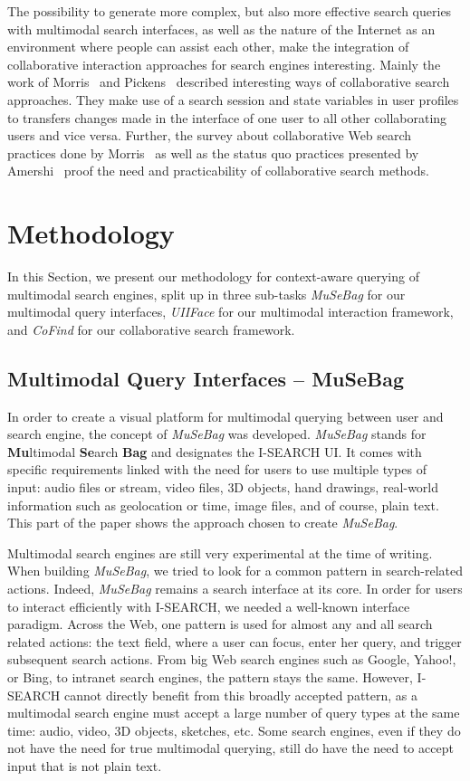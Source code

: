 \documentclass[runningheads,a4paper]{llncs} \usepackage[utf8]{inputenc}
\begin{document}
The possibility to generate more complex, but also more effective search queries with multimodal search interfaces, as well as the nature of the Internet as an environment where people can assist each other, make the integration of
collaborative interaction approaches for search engines interesting. Mainly the work of Morris~\cite{morris2007} and Pickens~\cite{pickens2008} described interesting ways of collaborative search approaches. They make use of a search
session and state variables in user profiles to transfers changes made in the interface of one user to all other collaborating users and vice versa. Further, the survey about collaborative Web search practices done by Morris~\cite{morris2008} as well as the status quo practices presented by Amershi~\cite{amershi2009} proof the need and practicability of collaborative search methods.

\section{Methodology}
In this Section, we present our methodology for context-aware querying of multimodal search engines, split up in three sub-tasks \emph{MuSeBag} for our multimodal query interfaces, \emph{UIIFace} for our multimodal interaction framework, and \emph{CoFind} for our collaborative search framework.

\subsection{Multimodal Query Interfaces -- MuSeBag}
In order to create a visual platform for multimodal querying between user and search engine, the concept of \emph{MuSeBag} was developed. \emph{MuSeBag} stands for \textbf{Mu}ltimodal \textbf{Se}arch \textbf{Bag} and designates the \mbox{I-SEARCH} UI. It comes with specific requirements linked with the need for users to use multiple types of input: audio files or stream, video files, 3D objects, hand drawings, real-world information such as geolocation or time, image files, and of course, plain text. This part of the paper shows the approach chosen to create \emph{MuSeBag}.

Multimodal search engines are still very experimental at the time of writing. When building \emph{MuSeBag}, we tried to look for a common pattern in search-related actions. Indeed, \emph{MuSeBag} remains a search interface at its core. In order for users to interact efficiently with \mbox{I-SEARCH}, we needed a well-known interface paradigm. Across the Web, one pattern is used for almost any and all search related actions: the text field, where a user can focus, enter her query, and trigger subsequent search actions. From big Web search engines such as Google, Yahoo!, or Bing, to intranet search engines, the pattern stays the same. However, \mbox{I-SEARCH} cannot directly benefit from this broadly accepted pattern, as a multimodal search engine must accept a large number of query types at the same time: audio, video, 3D objects, sketches, etc. Some search engines, even if they do not have the need for true multimodal querying, still do have the need to accept input that is not plain text.
\end{document}
